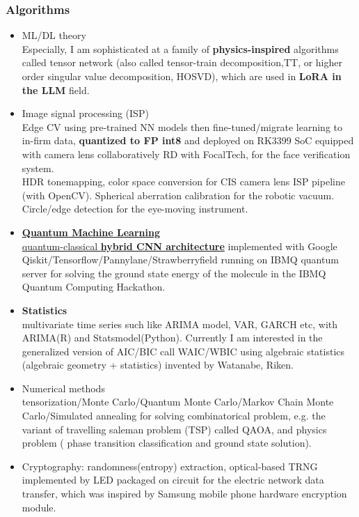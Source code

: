\documentclass[11pt]{article}
\begin{document}
\begin{multicols*}{2}
\subsubsection*{Algorithms}
\begin{itemize}[noitemsep]
    \item ML/DL theory\\ Especially, I am sophisticated at a family of \textbf{physics-inspired} algorithms called tensor network (also called tensor-train decomposition,TT, or higher order singular value decomposition, HOSVD), which are used in \textbf{LoRA in the LLM} field. 
    \item Image signal processing (ISP) \\
    Edge CV using pre-trained NN models then fine-tuned/migrate learning to in-firm data,\textbf{ quantized to FP int8 }and deployed on RK3399 SoC equipped with camera lens collaboratively RD with FocalTech, for the face verification system.\\
    HDR tonemapping, color space conversion for CIS camera lens ISP pipeline (with OpenCV). Spherical aberration calibration for the robotic vacuum. \\
    Circle/edge detection for the eye-moving instrument.  
    \item \href{https://github.com/Kuo-TingKai/IBMQcamp2020_VQE_team}{\textbf{Quantum Machine Learning}\\ quantum-classical\textbf{ hybrid CNN architecture}} implemented with Google Qiskit/Tensorflow/Pannylane/Strawberryfield running on IBMQ quantum server for solving the ground state energy of the molecule in the IBMQ Quantum Computing Hackathon.\\
    \item \textbf{Statistics}\\ multivariate time series such like ARIMA model, VAR, GARCH etc, with ARIMA(R) and Statsmodel(Python). Currently I am interested in the generalized version of AIC/BIC call WAIC/WBIC using algebraic statistics (algebraic geometry + statistics) invented by Watanabe, Riken.
    \item Numerical methods\\tensorization/Monte Carlo/Quantum Monte Carlo/Markov Chain Monte Carlo/Simulated annealing for solving combinatorical problem, e.g. the variant of travelling saleman problem (TSP) called QAOA, and physics problem ( phase transition classification and ground state solution).
    \item Cryptography: randomness(entropy) extraction, optical-based TRNG implemented by LED packaged on circuit for the electric network data transfer, which was inspired by Samsung mobile phone hardware encryption module.
\end{itemize}


\end{multicols*}
\end{document}
